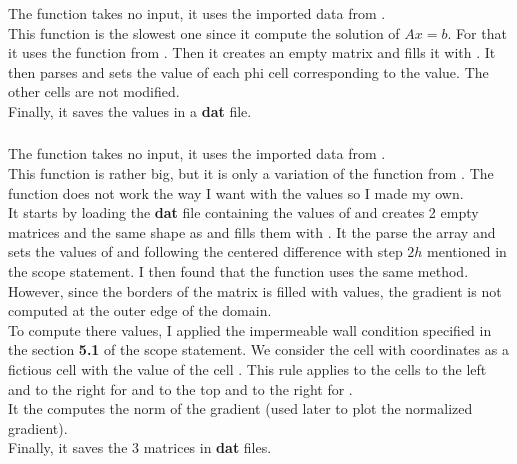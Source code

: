 \subsubsection{\textcolor{func}{}}
The function \textcolor{func}{} takes no input, it uses the
imported data from .\\
This function is the slowest one since it compute the solution of $Ax = b$. For
that it uses the function  from . Then it creates
an empty matrix  and fills it with . It then parses
 and sets the value of each phi cell corresponding to the  value.
The other cells are not modified.\\
Finally, it saves the values in a \textbf{dat} file.

\subsubsection{\textcolor{func}{}}
The function \textcolor{func}{} takes no input, it uses the imported data
from .\\
This function is rather big, but it is only a variation of the 
function from . The function  does not work
the way I want with the  values so I made my own.\\
It starts by loading the \textbf{dat} file containing the values of 
and creates 2 empty matrices  and  the same shape as
 and fills them with . It the parse the 
array and sets the values of  and  following the centered
difference with step $2h$ mentioned in the scope statement. I then found that
the function  uses the same method. However, since the
borders of the matrix  is filled with  values, the
gradient is not computed at the outer edge of the domain.\\
To compute there values, I applied the impermeable wall condition specified in
the section \textbf{5.1} of the scope statement. We consider the 
 cell with coordinates \py{[i - 1, j]} as a fictious cell with
the value of the cell \py{[i, j]}. This rule applies to the cells to the left
and to the right for  and to the top and to the right for
.\\
It the computes the norm of the gradient (used later to plot the normalized
gradient).\\
Finally, it saves the 3 matrices in \textbf{dat} files.

